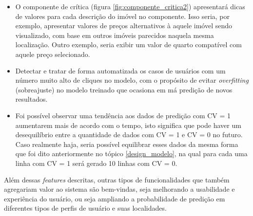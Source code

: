 \begin{itemize}
  \item O componente de crítica (figura \ref{fig:componente_critica2}) apresentará dicas de valores para cada descrição do imóvel no componente. Isso seria, por exemplo, apresentar valores de preços alternativos à aquele imóvel sendo visualizado, com base em outros imóveis parecidos naquela mesma localização. Outro exemplo, seria exibir um valor de quarto compatível com aquele preço selecionado.

  \item Detectar e tratar de forma automatizada os casos de usuários com um número muito alto de cliques no modelo, com o propósito de evitar \textit{overfitting} (sobreajuste) no modelo treinado que ocasiona em má predição de novos resultados.
  
  \item Foi possível observar uma tendência aos dados de predição com CV = 1 aumentarem mais de acordo com o tempo, isto significa que pode haver um desequilíbrio entre a quantidade de dados com CV = 1 e CV = 0 no futuro. Caso realmente haja, seria possível equilibrar esses dados da mesma forma que foi dito anteriormente no tópico \ref{design_modelo}, na qual para cada uma linha com CV = 1 será gerado 10 linhas com CV = 0.
\end{itemize}

Além dessas \textit{features} descritas, outras tipos de funcionalidades que também agregariam valor ao sistema são bem-vindas, seja melhorando a usabilidade e experiência do usuário, ou seja ampliando a probabilidade de predição em diferentes tipos de perfis de usuário e suas localidades.



